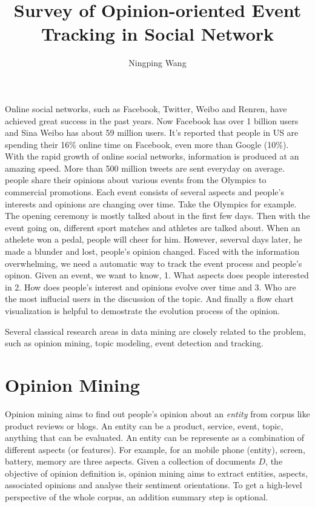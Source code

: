 \documentclass{article}
\title{Survey of Opinion-oriented Event Tracking in Social Network}
\author{Ningping Wang}
\begin{document}
\maketitle

Online social networks, such as Facebook, Twitter, Weibo and Renren, have achieved great success in the past years. Now Facebook has over 1 billion users and Sina Weibo has about 59 million users. It's reported that people in US are spending their 16\% online time on Facebook, even more than Google (10\%). With the rapid growth of online social networks, information is produced at an amazing speed. More than 500 million tweets are sent everyday on average. people share their opinions about various events from the Olympics to commercial promotions. Each event consists of several aspects and people's interests and opinions are changing over time. Take the Olympics for example. The opening ceremony is mostly talked about in the first few days. Then with the event going on, different sport matches and athletes are talked about. When an athelete won a pedal, people will cheer for him. However, severval days later, he made a blunder and lost, people's opinion changed. Faced with the information overwhelming, we need a automatic way to track the event process and people's opinon. Given an event, we want to know, 1. What aspects does people interested in 2. How does people's interest and opinions evolve over time and 3. Who are the most influcial users in the discussion of the topic. And finally a flow chart visualization is helpful to demostrate the evolution process of the opinion.

Several classical research areas in data mining are closely related to the problem, such as opinion mining, topic modeling, event detection and tracking. 

\section {Opinion Mining}
Opinion mining aims to find out people's opinion about an {\em entity} from corpus like product reviews or blogs. An entity can be a product, service, event, topic, anything that can be evaluated. An entity can be represente as a combination of different aspects (or features). For example, for an mobile phone (entity), screen, battery, memory are three aspects. Given a collection of documents $D$, the objective of opinion definition is, opinion mining aims to extract entities, aspects, associated opinions and analyse their sentiment orientations. To get a high-level perspective of the whole corpus, an addition summary step is optional.
\end{document}
